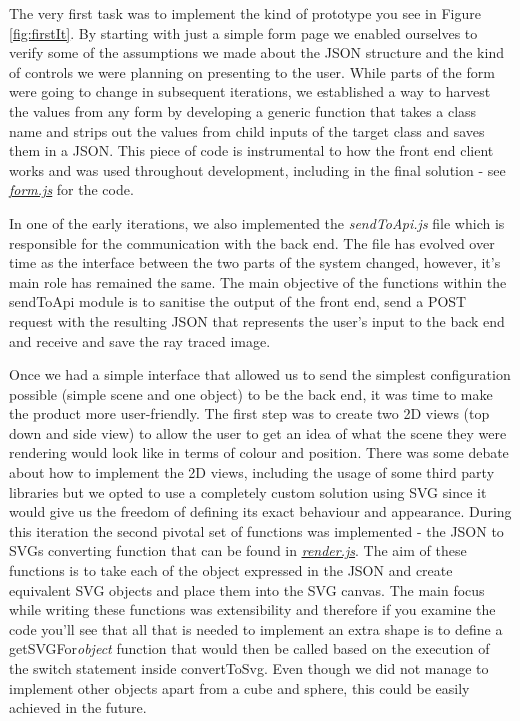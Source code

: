 \documentclass[a4paper]{report}
\begin{document}
	\par The very first task was to implement the kind of prototype you see in Figure \ref{fig:firstIt}. By starting with just a simple form page we enabled ourselves to verify some of the assumptions we made about the JSON structure and the kind of controls we were planning on presenting to the user. While parts of the form were going to change in subsequent iterations, we established a way to harvest the values from any form by developing a generic function that takes a class name and strips out the values from child inputs of the target class and saves them in a JSON. This piece of code is instrumental to how the front end client works and was used throughout development, including in the final solution - see \href{https://github.com/davidbenicek/raytracer/blob/e85055df16c4534989220de84ce67656a276bf33/src/RayTracer/Public/js/form.js#L30}{\underline{\textit{form.js}}} for the code.\newline 
	
	In one of the early iterations, we also implemented the \textit{sendToApi.js} file which is responsible for the communication with the back end. The file has evolved over time as the interface between the two parts of the system changed, however, it's main role has remained the same. The main objective of the functions within the sendToApi module is to sanitise the output of the front end, send a POST request with the resulting JSON that represents the user's input to the back end and receive and save the ray traced image. 
	
	\par Once we had a simple interface that allowed us to send the simplest configuration possible (simple scene and one object) to be the back end, it was time to make the product more user-friendly. The first step was to create two 2D views (top down and side view) to allow the user to get an idea of what the scene they were rendering would look like in terms of colour and position. There was some debate about how to implement the 2D views, including the usage of some third party libraries but we opted to use a completely custom solution using SVG since it would give us the freedom of defining its exact behaviour and appearance. During this iteration the second pivotal set of functions was implemented - the JSON to SVGs converting function that can be found in \href{https://github.com/davidbenicek/raytracer/blob/e85055df16c4534989220de84ce67656a276bf33/src/RayTracer/Public/js/render.js#L43}{\underline{\textit{render.js}}}. The aim of these functions is to take each of the object expressed in the JSON and create equivalent SVG objects and place them into the SVG canvas. The main focus while writing these functions was extensibility and therefore if you examine the code you'll see that all that is needed to implement an extra shape is to define a getSVGFor\textit{object} function that would then be called based on the execution of the switch statement inside convertToSvg. Even though we did not manage to implement other objects apart from a cube and sphere, this could be easily achieved in the future. \newline
	
\end{document}
